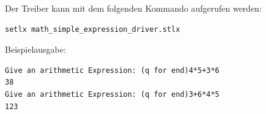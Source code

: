 Der Treiber kann mit dem folgenden Kommando aufgerufen werden:
\begin{Verbatim}
setlx math_simple_expression_driver.stlx
\end{Verbatim}
Beispielausgabe:
\begin{Verbatim}
Give an arithmetic Expression: (q for end)4*5+3*6
38
Give an arithmetic Expression: (q for end)3+6*4*5
123
\end{Verbatim}

